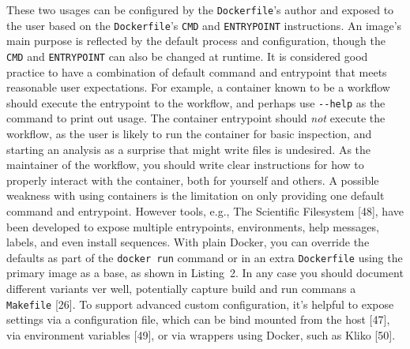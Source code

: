 \documentclass[10pt,letterpaper]{article}
\newenvironment{Shaded}{\begin{snugshade}}{\end{snugshade}}
\newcommand{\CommentTok}[1]{\textcolor[rgb]{0.56,0.35,0.01}{\textit{#1}}}
\newcommand{\KeywordTok}[1]{\textcolor[rgb]{0.13,0.29,0.53}{\textbf{#1}}}
\newcommand{\NormalTok}[1]{#1}
\newcommand{\StringTok}[1]{\textcolor[rgb]{0.31,0.60,0.02}{#1}}
\begin{document}
These two usages can be configured by the \texttt{Dockerfile}'s author
and exposed to the user based on the \texttt{Dockerfile}'s \texttt{CMD}
and \texttt{ENTRYPOINT} instructions. An image's main purpose is
reflected by the default process and configuration, though the
\texttt{CMD} and \texttt{ENTRYPOINT} can also be changed at runtime. It
is considered good practice to have a combination of default command and
entrypoint that meets reasonable user expectations. For example, a
container known to be a workflow should execute the entrypoint to the
workflow, and perhaps use \texttt{-\/-help} as the command to print out
usage. The container entrypoint should \emph{not} execute the workflow,
as the user is likely to run the container for basic inspection, and
starting an analysis as a surprise that might write files is undesired.
As the maintainer of the workflow, you should write clear instructions
for how to properly interact with the container, both for yourself and
others. A possible weakness with using containers is the limitation on
only providing one default command and entrypoint. However tools, e.g.,
The Scientific Filesystem {[}48{]}, have been developed to expose
multiple entrypoints, environments, help messages, labels, and even
install sequences. With plain Docker, you can override the defaults as
part of the \texttt{docker\ run} command or in an extra
\texttt{Dockerfile} using the primary image as a base, as shown in
Listing~2. In any case you should document different variants ver well,
potentially capture build and run commans a \texttt{Makefile} {[}26{]}.
To support advanced custom configuration, it's helpful to expose
settings via a configuration file, which can be bind mounted from the
host {[}47{]}, via environment variables {[}49{]}, or via wrappers using
Docker, such as Kliko {[}50{]}.

\footnotesize

\begin{Shaded}
\end{Shaded}

\begin{Shaded}
\end{Shaded}
\end{document}
